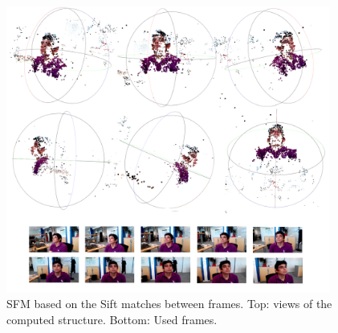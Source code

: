    \begin{figure}[tpbh]
      \centering
      \includegraphics[width=0.95\textwidth]{../images/SFM3_2.png}
      \caption{ SFM based on the Sift matches between frames. Top: views of the computed structure. Bottom: Used frames. }
      \label{sfm4}
   \end{figure}

